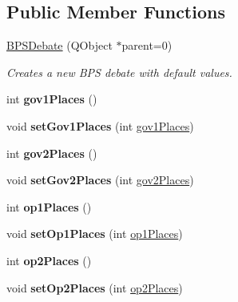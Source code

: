 \subsection*{Public Member Functions}
\begin{DoxyCompactItemize}
\item 
\hyperlink{classBPSDebate_aa8551c8847ba48d6020abdf2c6e0539d}{B\-P\-S\-Debate} (Q\-Object $\ast$parent=0)
\begin{DoxyCompactList}\small\item\em Creates a new B\-P\-S debate with default values. \end{DoxyCompactList}\item 
\hypertarget{classBPSDebate_a153f32f70c7ca8245a274794c0932a5f}{int {\bfseries gov1\-Places} ()}\label{classBPSDebate_a153f32f70c7ca8245a274794c0932a5f}

\item 
\hypertarget{classBPSDebate_a289e432b6dd9cee8f73e4a6d7a45f225}{void {\bfseries set\-Gov1\-Places} (int \hyperlink{classBPSDebate_aff0bc6617abe4eb69e9ddef87a0ad021}{gov1\-Places})}\label{classBPSDebate_a289e432b6dd9cee8f73e4a6d7a45f225}

\item 
\hypertarget{classBPSDebate_aab0e2510bd9492d2a0af01f01215eaec}{int {\bfseries gov2\-Places} ()}\label{classBPSDebate_aab0e2510bd9492d2a0af01f01215eaec}

\item 
\hypertarget{classBPSDebate_ae948a39ce6235568d30498a51ca68374}{void {\bfseries set\-Gov2\-Places} (int \hyperlink{classBPSDebate_adc50f853f398e82b65bb5013cc8f6ccc}{gov2\-Places})}\label{classBPSDebate_ae948a39ce6235568d30498a51ca68374}

\item 
\hypertarget{classBPSDebate_a20483fad2f39e2c5cdc0b6dc934334e3}{int {\bfseries op1\-Places} ()}\label{classBPSDebate_a20483fad2f39e2c5cdc0b6dc934334e3}

\item 
\hypertarget{classBPSDebate_a3f8642ce77566f4b452dbfae90568658}{void {\bfseries set\-Op1\-Places} (int \hyperlink{classBPSDebate_a299bc40d5f80b2d4066c7869f56c70ba}{op1\-Places})}\label{classBPSDebate_a3f8642ce77566f4b452dbfae90568658}

\item 
\hypertarget{classBPSDebate_a1a66edf202ff6181e0b26d1e0bcf8003}{int {\bfseries op2\-Places} ()}\label{classBPSDebate_a1a66edf202ff6181e0b26d1e0bcf8003}

\item 
\hypertarget{classBPSDebate_a59385753ceddc0899f1fad730aaadbc1}{void {\bfseries set\-Op2\-Places} (int \hyperlink{classBPSDebate_a98039d27d11878e68c88d41570553eae}{op2\-Places})}\label{classBPSDebate_a59385753ceddc0899f1fad730aaadbc1}


\end{DoxyCompactItemize}
